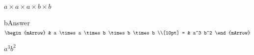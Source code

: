 \begin{enumerate}[resume]
\begin{subtask}
    \task[]  $ a \times a \times a \times b \times b $
              \begin{envOut}[height=3cm]{bAnswer}
			       $\begin{mArrow}
			                & a \times a \times b \times b \times b      \\[10pt]
                          = & a^3 b^2	   
	                \end{mArrow}$
              \end{envOut}			  
			  \begin{exercise}\begin{shortsolution}  
				       $a^3 b^2$
			  \end{shortsolution}\end{exercise}
  \end{subtask}
\end{enumerate}


